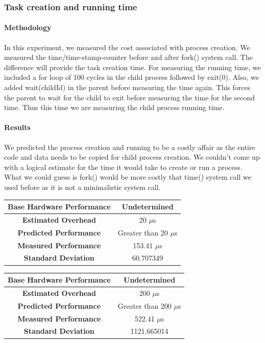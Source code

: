 \documentclass[conference]{IEEEtran}
\begin{document}

\subsubsection{Task creation and running time}

\paragraph{Methodology}
 In this experiment, we measured the cost associated with process creation. We measured the time/time-stamp-counter before and after fork() system call. The difference will provide the task creation time. 
 For measuring the running time, we included a for loop of 100 cycles in the child process followed by exit(0). Also, we added wait(childId) in the parent before measuring the time again. This forces the parent to wait for the child to exit before measuring the time for the second time. Thus this time we are measuring the child process running time.

\paragraph{Results}

We predicted the process creation and running to be a costly affair as the entire code and data needs to be copied for child process creation. We couldn't come up with a logical estimate for the time it would take to create or run a process. What we could guess is fork() would be more costly that time() system call we used before as it is not a minimalistic system call.

\begin{center}
\begin{tabular}{ |c|c| } 
  \hline
  \textbf{Base Hardware Performance} & Undetermined \\ 
  \hline
  \textbf{Estimated Overhead} &  20 $\mu$s \\ 
  \hline
  \textbf{Predicted Performance} & Greater than 20 $\mu$s \\ 
  \hline
  \textbf{Measured Performance} & 153.41 $\mu$s \\ 
  \hline
  \textbf{Standard Deviation} & 60.707349  \\ 
  \hline
\end{tabular}
\end{center}


\begin{center}
\begin{tabular}{ |c|c| } 
  \hline
  \textbf{Base Hardware Performance} & Undetermined \\ 
  \hline
  \textbf{Estimated Overhead} &  200 $\mu$s \\ 
  \hline
  \textbf{Predicted Performance} & Greater than 200 $\mu$s \\ 
  \hline
  \textbf{Measured Performance} & 522.41 $\mu$s \\ 
  \hline
  \textbf{Standard Deviation} & 1121.665014  \\ 
  \hline
\end{tabular}
\end{center}
\end{document}

